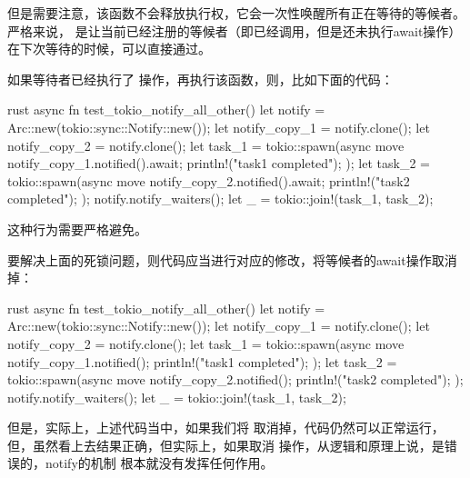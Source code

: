 但是需要注意，该函数不会释放执行权，它会一次性唤醒所有正在等待的等候者。严格来说，
是让当前已经注册的等候者（即已经调用，但是还未执行await操作）
在下次等待的时候，可以直接通过。
\begin{critical}
如果等待者已经执行了
操作，再执行该函数，则，比如下面的代码：
\begin{code-block}{rust}
async fn test_tokio_notify_all_other() {
    let notify = Arc::new(tokio::sync::Notify::new());
    let notify_copy_1 = notify.clone();
    let notify_copy_2 = notify.clone();
    let task_1 = tokio::spawn(async move {
        notify_copy_1.notified().await;
        println!("task1 completed");
    });
    let task_2 = tokio::spawn(async move {
        notify_copy_2.notified().await;
        println!("task2 completed");
    });
    notify.notify_waiters();
    let _ = tokio::join!(task_1, task_2);
}
\end{code-block}
这种行为需要严格避免。
\end{critical}

要解决上面的死锁问题，则代码应当进行对应的修改，将等候者的await操作取消掉：
\begin{code-block}{rust}
async fn test_tokio_notify_all_other() {
    let notify = Arc::new(tokio::sync::Notify::new());
    let notify_copy_1 = notify.clone();
    let notify_copy_2 = notify.clone();
    let task_1 = tokio::spawn(async move {
        notify_copy_1.notified();
        println!("task1 completed");
    });
    let task_2 = tokio::spawn(async move {
        notify_copy_2.notified();
        println!("task2 completed");
    });
    notify.notify_waiters();
    let _ = tokio::join!(task_1, task_2);
}
\end{code-block}
但是，实际上，上述代码当中，如果我们将
取消掉，代码仍然可以正常运行，但，虽然看上去结果正确，但实际上，如果取消
操作，从逻辑和原理上说，是错误的，notify的机制
根本就没有发挥任何作用。

